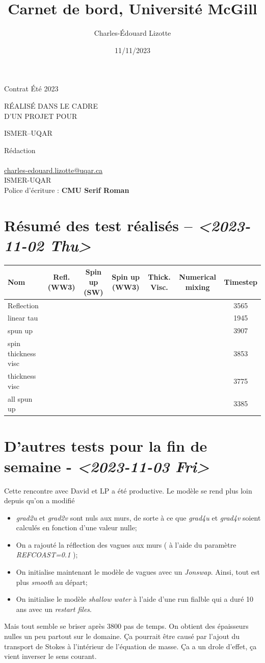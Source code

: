 \documentclass[10pt]{article}
\author{Charles-Édouard Lizotte}
\date{11/11/2023}
\title{Carnet de bord, Université McGill}
\makeatletter
\numberwithin{equation}{section}
\newcommand{\cmark}{\ding{52}}
\newcommand{\xmark}{\ding{55}}
\newcommand{\mytitlepage}{
\begin{titlepage}
\begin{center}
{\Huge \thesubtitle \par}
\vspace{2cm}
{\Huge \MakeUppercase{\thetitle} \par}
\vspace{2cm}
RÉALISÉ DANS LE CADRE\\ D'UN PROJET POUR \par
\vspace{2cm}
{\Huge ISMER--UQAR \par}
\vspace{2cm}
{\thedate}
\end{center}
\vfill
Rédaction \\
{\theauthor}\\
\url{charles-edouard.lizotte@uqar.ca}\\
ISMER-UQAR\\
Police d'écriture : \textbf{CMU Serif Roman}
\end{titlepage}
}
\newcommand{\thesubtitle}{Contrat Été 2023}
\makeatother
\begin{document}
\mytitlepage
\tableofcontents\newpage
\section{Résumé des test réalisés -- \textit{<2023-11-02 Thu>}}
\label{sec:org1d97bd3}
\begin{center}
\begin{tabular}{lcccccc}
Nom & Refl. (WW3) & Spin up (SW) & Spin up (WW3) & Thick. Visc. & Numerical mixing & Timestep\\
\hline
\hline
Reflection & \cmark & \xmark & \cmark & \xmark & \cmark & 3565\\
linear tau & \xmark & \xmark & \xmark & \xmark & \cmark & 1945\\
spun up & \xmark & \cmark & \xmark & \xmark & \cmark & 3907\\
spin thickness visc & \xmark & \cmark & \xmark & \cmark & \xmark & 3853\\
thickness visc & \xmark & \xmark & \xmark & \cmark & \xmark & 3775\\
all spun up & \cmark & \cmark & \cmark & \xmark & \xmark & 3385\\
\hline
\end{tabular}
\end{center}
\section{D'autres tests pour la fin de semaine - \textit{<2023-11-03 Fri>}}
\label{sec:orgf42d537}

Cette rencontre avec David et LP a été productive.
Le modèle se rend plus loin depuis qu'on a modifié
\begin{itemize}
\item \emph{grad2u} et \emph{grad2v} sont nuls aux murs, de sorte à ce que \emph{grad4u} et \emph{grad4v} soient calculés en fonction d'une valeur nulle;
\item On a rajouté la réflection des vagues aux murs ( à l'aide du paramètre \emph{REFCOAST=0.1} );
\item On initialise maintenant le modèle de vagues avec un \emph{Jonswap}.
Ainsi, tout est plus \emph{smooth} au départ;
\item On initialise le modèle \emph{shallow water} à l'aide d'une run fialble qui a duré 10 ans avec un \emph{restart files}.
\end{itemize}

Mais tout semble se briser après 3800 pas de temps.
On obtient des épaisseurs nulles un peu partout sur le domaine.
Ça pourrait être causé par l'ajout du transport de Stokes à l'intérieur de l'équation de masse.
Ça a un drole d'effet, ça vient inverser le sens courant. \bigskip
\end{document}
